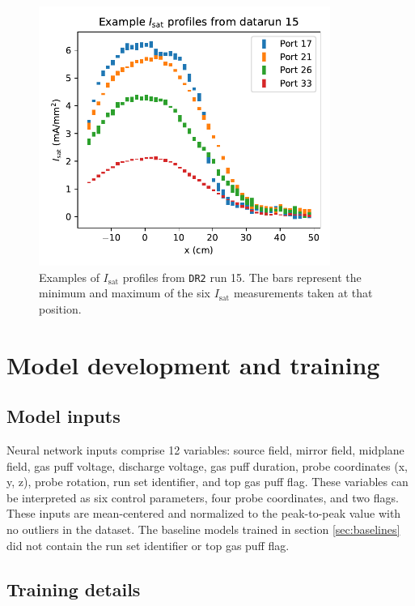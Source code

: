 \begin{figure}
	\centering
	\includegraphics[width=270pt]{figures/PP1_isat_example_bars.pdf}
	\caption[size=12]{\label{fig:PP1_isat_example}Examples of $I_\text{sat}$ profiles from \texttt{DR2} run 15. The bars represent the minimum and maximum of the six $I_\text{sat}$ measurements taken at that position. }
\end{figure}

\section{Model development and training}
\label{sec:model_dev}

\subsection{Model inputs}

Neural network inputs comprise 12 variables: source field, mirror field, midplane field, gas puff voltage, discharge voltage, gas puff duration, probe coordinates (x, y, z), probe rotation, run set identifier, and top gas puff flag. These variables can be interpreted as six control parameters, four probe coordinates, and two flags. These inputs are mean-centered and normalized to the peak-to-peak value with no outliers in the dataset. The baseline models trained in section \ref{sec:baselines} did not contain the run set identifier or top gas puff flag.

\subsection{Training details}

